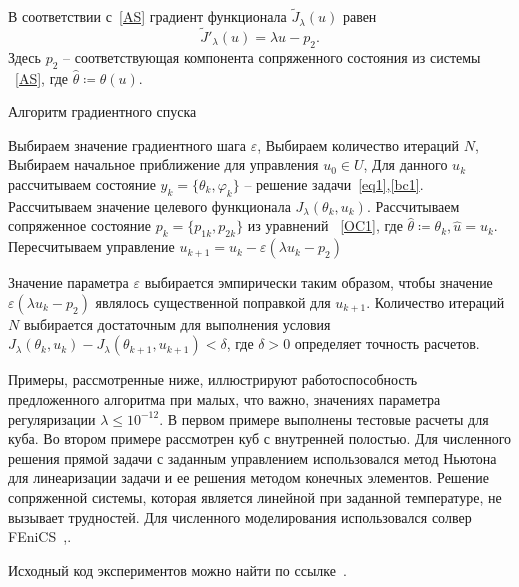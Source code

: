 \documentclass[12pt]{article}
\begin{document}
    В соответствии с~\eqref{AS} градиент функционала $\tilde J_\lambda(u)$ равен
    \[ \tilde J'_\lambda (u) = \lambda u - p_2. \]
    Здесь $p_2$ -- соответствующая компонента сопряженного состояния из системы ~\eqref{AS},
    где $\hat{\theta}\coloneqq\theta(u)$.

    \begin{algorithm}[H]
        \caption{Алгоритм градиентного спуска}
        \label{alg:algorithm}
        \begin{algorithmic}[1]
            \State Выбираем значение градиентного шага $\varepsilon$,
            \State Выбираем количество итераций $N$,
            \State Выбираем начальное приближение для управления $u_0 \in U$,
                \State Для данного $u_k$ рассчитываем состояние $y_k = \{\theta_k, \varphi_k\}$ --
                решение задачи~\eqref{eq1},\eqref{bc1}.
                \State Рассчитываем значение целевого функционала $J_\lambda(\theta_k, u_k)$.
                \State Рассчитываем сопряженное состояние $p_k=\{p_{1k},p_{2k}\}$ из уравнений ~\eqref{OC1},
                где $ \hat{\theta} \coloneqq \theta_k, \hat{u}=u_k$.
                \State Пересчитываем управление $u_{k+1} = u_k - \varepsilon (\lambda u_k - p_2)$
            \EndFor
        \end{algorithmic}
    \end{algorithm}
    Значение параметра $\varepsilon$ выбирается эмпирически таким образом, чтобы значение
    $\varepsilon (\lambda u_k - p_2)$ являлось существенной поправкой для $u_{k+1}$.
    Количество итераций $N$ выбирается достаточным для выполнения условия
    $J_\lambda(\theta_k, u_k) - J_\lambda(\theta_{k+1}, u_{k+1}) < \delta$, где $\delta>0$
    определяет точность расчетов.

    Примеры, рассмотренные ниже, иллюстрируют работоспособность предложенного алгоритма при
    малых, что важно, значениях параметра регуляризации $\lambda \leq 10^{-12}$.
    В первом примере выполнены тестовые расчеты для куба.
    Во втором примере рассмотрен куб с внутренней полостью.
    Для численного решения прямой задачи с заданным управлением использовался
    метод Ньютона для линеаризации задачи и ее решения методом конечных элементов.
    Решение сопряженной системы, которая является линейной при заданной температуре, не вызывает трудностей.
    Для численного моделирования использовался солвер FEniCS~\cite{fenics},\cite{dolfin}.

    Исходный код экспериментов можно найти по ссылке~\cite{mesenev-github}.
\end{document}
